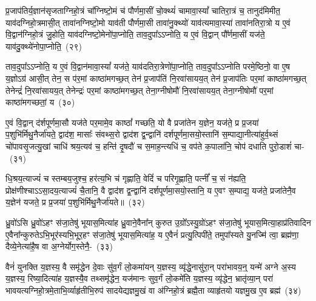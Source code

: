 {\anuvakamend[{वै मनः॒ स्फ्य इति॑ युन॒क्त्वेका॑\-दश च}]}%

प्र॒जा\-प॑तिर्य॒ज्ञान॑सृजता\-ग्निहो॒त्रं चा᳚ग्निष्टो॒मं च॑ पौर्णमा॒सीं चो॒क्थ्यं॑ चामावा॒स्यां᳚ चातिरा॒त्रं च॒ तानुद॑मिमीत॒ याव॑दग्निहो॒त्रमासी॒त् तावा॑नग्निष्टो॒मो याव॑ती पौर्णमा॒सी तावा॑नु॒क्थ्यो॑ याव॑त्यमावा॒स्या॑ तावा॑नतिरा॒त्रो य ए॒वं वि॒द्वान॑ग्निहो॒त्रं जु॒होति॒ याव॑दग्निष्टो॒मेनो॑पा॒प्नोति॒ ताव॒दुपा᳚\-ऽऽ\-प्नोति॒ य ए॒वं वि॒द्वान् पौ᳚र्णमा॒सीं यज॑ते॒ याव॑दु॒क्थ्ये॑नो\-पा॒प्नोति॒~(२९)

ताव॒दुपा᳚\-ऽऽ\-प्नोति॒ य ए॒वं वि॒द्वान॑मावा॒स्यां᳚ यज॑ते॒ याव॑दतिरा॒त्रेणो॑पा॒प्नोति॒ ताव॒दुपा᳚\-ऽऽ\-प्नोति परमे॒ष्ठिनो॒ वा ए॒ष य॒ज्ञो\-ऽग्र॑ आसी॒त् तेन॒ स प॑र॒मां काष्ठा॑मगच्छ॒त् तेन॑ प्र॒जा\-प॑तिं नि॒रवा॑सायय॒त् तेन॑ प्र॒जा\-प॑तिः पर॒मां काष्ठा॑मगच्छ॒त् तेनेन्द्रं॑ नि॒रवा॑सायय॒त् तेनेन्द्रः॑ पर॒मां काष्ठा॑मगच्छ॒त् तेना॒ग्नी\-षोमौ॑ नि॒रवा॑सायय॒त् तेना॒ग्नी\-षोमौ॑ पर॒मां काष्ठा॑मगच्छतां॒ य~(३०)

ए॒वं वि॒द्वान् द॑र्\mbox{}शपूर्णमा॒सौ यज॑ते पर॒मामे॒व काष्ठां᳚ गच्छति॒ यो वै प्रजा॑तेन य॒ज्ञेन॒ यज॑ते॒ प्र प्र॒जया॑ प॒शुभि॑र्मिथु॒नैर्जा॑यते॒ द्वाद॑श॒ मासाः᳚ संवथ्स॒रो द्वाद॑श द्व॒न्द्वानि॑ दर्\mbox{}श\-पूर्ण\-मा॒सयो॒स्तानि॑ स॒म्पाद्या॒नीत्या॑हुर्व॒थ्सं चो॑पावसृ॒जत्यु॒खां चाधि॑ श्रय॒त्यव॑ च॒ हन्ति॑ दृ॒षदौ॑ च स॒माह॒न्त्यधि॑ च॒ वप॑ते क॒पाला॑नि॒ चोप॑ दधाति पुरो॒डाशं॑ चा-~(३१)

धि॒श्रय॒त्याज्यं॑ च स्तम्बय॒जुश्च॒ हर॑त्य॒भि च॑ गृह्णाति॒ वेदिं॑ च परिगृ॒ह्णाति॒ पत्नीं᳚ च॒ सं न॑ह्यति॒ प्रोक्ष॑णीश्चा\-ऽऽ\-सा॒दय॒त्याज्यं॑ चै॒तानि॒ वै द्वाद॑श द्व॒न्द्वानि॑ दर्\mbox{}श\-पूर्ण\-मा॒सयो॒स्तानि॒ य ए॒वꣳ स॒म्पाद्य॒ यज॑ते॒ प्रजा॑तेनै॒व य॒ज्ञेन॑ यजते॒ प्र प्र॒जया॑ प॒शुभि॑र्मिथु॒नैर्जा॑यते॥~(३२)

{\anuvakamend[{उ॒क्थ्ये॑नोपा॒प्नोत्य॑गच्छतां॒ यः पु॑रो॒डाशं॑ च चत्वारि॒ꣳ॒शच्च॑}]}%

ध्रु॒वो॑\-ऽसि ध्रु॒वो॑\-ऽहꣳ स॑जा॒तेषु॑ भूयास॒मित्या॑ह ध्रु॒वाने॒वैना᳚न् कुरुत उ॒ग्रो᳚\-ऽस्यु॒ग्रो॑\-ऽहꣳ स॑जा॒तेषु॑ भूयास॒मित्या॒हाप्र॑तिवादिन ए॒वैना᳚न्कुरुते\-ऽभि॒भूर॑स्यभि॒भूर॒हꣳ स॑जा॒तेषु॑ भूयास॒मित्या॑ह॒ य ए॒वैनं॑ प्रत्यु॒त्पिपी॑ते॒ तमुपा᳚स्यते यु॒नज्मि॑ त्वा॒ ब्रह्म॑णा॒ दैव्ये॒नेत्या॑है॒ष वा अ॒ग्नेर्योग॒स्तेनै॒-~(३३)

वैनं॑ युनक्ति य॒ज्ञस्य॒ वै समृ॑द्धेन दे॒वाः सु॑व॒र्गं लो॒कमा॑यन् य॒ज्ञस्य॒ व्यृ॑द्धे॒नासु॑रा॒न् परा॑भावय॒न्॒ यन्मे॑ अग्ने अ॒स्य य॒ज्ञस्य॒ रिष्या॒दित्या॑ह य॒ज्ञस्यै॒व तथ्समृ॑द्धेन॒ यज॑मानः सुव॒र्गं लो॒कमे॑ति य॒ज्ञस्य॒ व्यृ॑द्धेन॒ भ्रातृ॑व्या॒न् परा॑ भावयत्यग्नि\-हो॒त्रमे॒ताभि॒र्व्याहृ॑तीभि॒\-रुप॑ सादयेद्यज्ञमु॒खं वा अ॑ग्निहो॒त्रं ब्रह्मै॒ता व्याहृ॑तयो यज्ञमु॒ख ए॒व ब्रह्म॑~(३४)

